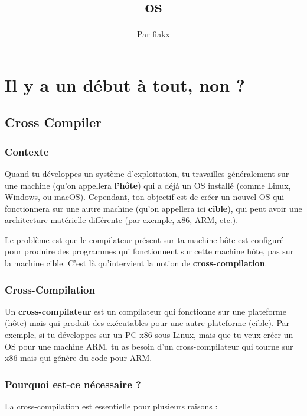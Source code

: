 \documentclass{article}
\title{\Huge os}
\author{\small Par fiakx}
\date{}
\begin{document}
\maketitle

\section*{Il y a un début à tout, non ?}

\subsection*{Cross Compiler}

\subsubsection*{Contexte}
Quand tu développes un système d'exploitation, tu travailles généralement sur une machine (qu'on appellera \textbf{l'hôte}) qui a déjà un OS installé (comme Linux, Windows, ou macOS). Cependant, ton objectif est de créer un nouvel OS qui fonctionnera sur une autre machine (qu'on appellera ici \textbf{cible}), qui peut avoir une architecture matérielle différente (par exemple, x86, ARM, etc.).

Le problème est que le compilateur présent sur ta machine hôte est configuré pour produire des programmes qui fonctionnent sur cette machine hôte, pas sur la machine cible. C'est là qu'intervient la notion de \textbf{cross-compilation}.

\subsubsection*{Cross-Compilation}
Un \textbf{cross-compilateur} est un compilateur qui fonctionne sur une plateforme (hôte) mais qui produit des exécutables pour une autre plateforme (cible). Par exemple, si tu développes sur un PC x86 sous Linux, mais que tu veux créer un OS pour une machine ARM, tu as besoin d'un cross-compilateur qui tourne sur x86 mais qui génère du code pour ARM.

\subsubsection*{Pourquoi est-ce nécessaire ?}
La cross-compilation est essentielle pour plusieurs raisons :
\end{document}
